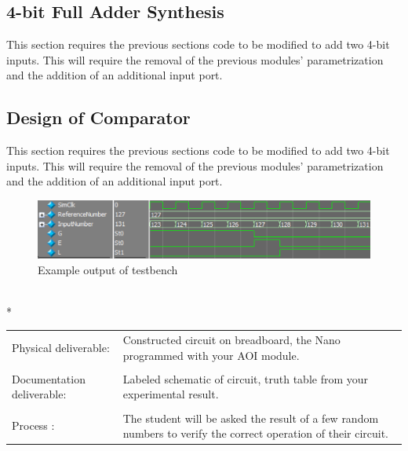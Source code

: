   \subsection{4-bit Full Adder Synthesis}
    This section requires the previous sections code to be modified to add two 4-bit inputs. This will require the removal of the previous modules' parametrization and the addition of an additional input port. 

  \subsection{Design of Comparator}
    This section requires the previous sections code to be modified to add two 4-bit inputs. This will require the removal of the previous modules' parametrization and the addition of an additional input port. 
    \begin{figure}[H]
      \label{TestbenchOutput}
      \includegraphics[width=.48\textwidth]{Images/ComparitorTestbench.png}
      \caption{Example output of testbench}
    \end{figure}

      \vspace{15px}
      \begin{centering}
        \begin{fminipage}{.43\textwidth}
          \vspace{3px}
          \\*
          \vspace{10px}
          \begin{tabular}{p{1.8cm}  p{5.4cm}}
            \raggedright Physical deliverable:                         &Constructed circuit on breadboard,  the Nano programmed with your AOI module.\\
            \\
            \raggedright Documentation deliverable:          & Labeled schematic of circuit,  truth table from your  experimental result.\\
            \\
            Process :                                                                            &The student will be asked the result of a few random numbers to verify the correct operation of their circuit.
          \end{tabular}
        \end{fminipage}
      \end{centering}
